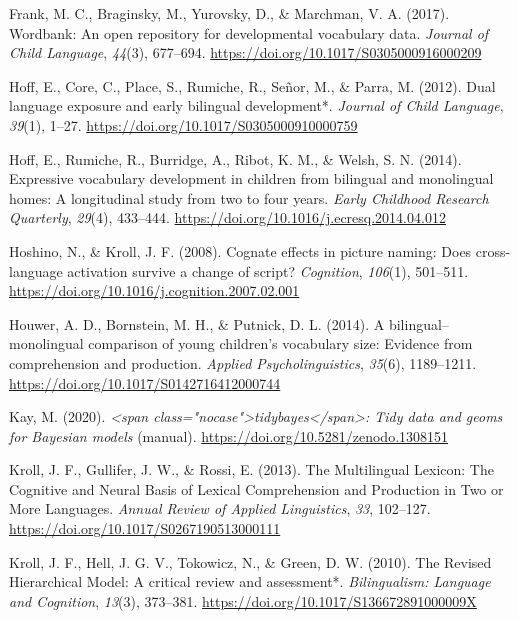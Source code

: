 \documentclass[
  english,
  man,man,floatsintext]{apa6}
\begin{document}
\leavevmode\hypertarget{ref-frank2017}{}%
Frank, M. C., Braginsky, M., Yurovsky, D., \& Marchman, V. A. (2017). Wordbank: An open repository for developmental vocabulary data. \emph{Journal of Child Language}, \emph{44}(3), 677--694. \url{https://doi.org/10.1017/S0305000916000209}

\leavevmode\hypertarget{ref-hoff2012}{}%
Hoff, E., Core, C., Place, S., Rumiche, R., Señor, M., \& Parra, M. (2012). Dual language exposure and early bilingual development*. \emph{Journal of Child Language}, \emph{39}(1), 1--27. \url{https://doi.org/10.1017/S0305000910000759}

\leavevmode\hypertarget{ref-hoff2014}{}%
Hoff, E., Rumiche, R., Burridge, A., Ribot, K. M., \& Welsh, S. N. (2014). Expressive vocabulary development in children from bilingual and monolingual homes: A longitudinal study from two to four years. \emph{Early Childhood Research Quarterly}, \emph{29}(4), 433--444. \url{https://doi.org/10.1016/j.ecresq.2014.04.012}

\leavevmode\hypertarget{ref-hoshino2008}{}%
Hoshino, N., \& Kroll, J. F. (2008). Cognate effects in picture naming: Does cross-language activation survive a change of script? \emph{Cognition}, \emph{106}(1), 501--511. \url{https://doi.org/10.1016/j.cognition.2007.02.001}

\leavevmode\hypertarget{ref-houwer2014}{}%
Houwer, A. D., Bornstein, M. H., \& Putnick, D. L. (2014). A bilingual--monolingual comparison of young children's vocabulary size: Evidence from comprehension and production. \emph{Applied Psycholinguistics}, \emph{35}(6), 1189--1211. \url{https://doi.org/10.1017/S0142716412000744}

\leavevmode\hypertarget{ref-kay2020}{}%
Kay, M. (2020). \emph{\textless span class="nocase"\textgreater tidybayes\textless/span\textgreater: Tidy data and geoms for Bayesian models} (manual). \url{https://doi.org/10.5281/zenodo.1308151}

\leavevmode\hypertarget{ref-kroll2013}{}%
Kroll, J. F., Gullifer, J. W., \& Rossi, E. (2013). The Multilingual Lexicon: The Cognitive and Neural Basis of Lexical Comprehension and Production in Two or More Languages. \emph{Annual Review of Applied Linguistics}, \emph{33}, 102--127. \url{https://doi.org/10.1017/S0267190513000111}

\leavevmode\hypertarget{ref-kroll2010}{}%
Kroll, J. F., Hell, J. G. V., Tokowicz, N., \& Green, D. W. (2010). The Revised Hierarchical Model: A critical review and assessment*. \emph{Bilingualism: Language and Cognition}, \emph{13}(3), 373--381. \url{https://doi.org/10.1017/S136672891000009X}
\end{document}
